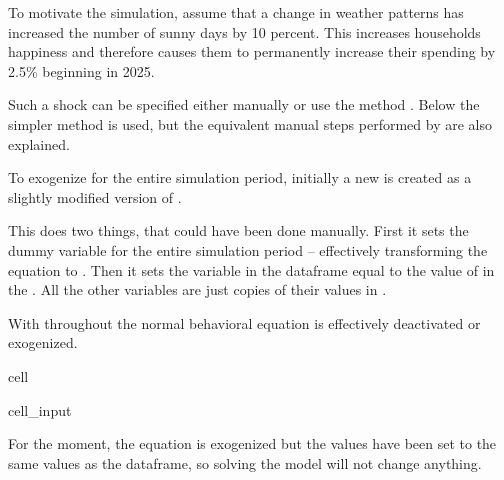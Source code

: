 \documentclass[letterpaper,10pt,english]{jupyterBook}
\begin{document}
\sphinxAtStartPar
To motivate the simulation, assume that a change in weather patterns has increased the number of sunny days by 10 percent. This increases households happiness and therefore causes them to permanently increase their spending by 2.5\% beginning in 2025.

\sphinxAtStartPar
Such a shock can be specified either manually or use the method . Below the simpler  method is used, but the equivalent manual steps performed by  are also explained.

\sphinxAtStartPar
To exogenize  for the entire simulation period, initially a new  is created as a slightly modified version of  .

\sphinxAtStartPar
{}

\sphinxAtStartPar
This does two things, that could have been done manually.  First it sets the dummy variable  for the entire simulation period – effectively transforming the equation to .  Then it sets the variable  in the  dataframe equal to the value of  in the  . All the other variables are  just copies of their values in .

\sphinxAtStartPar
With  throughout the normal behavioral equation is effectively de\sphinxhyphen{}activated or exogenized.

\begin{sphinxuseclass}{cell}\begin{sphinxVerbatimInput}

\begin{sphinxuseclass}{cell_input}
\begin{sphinxVerbatim}[commandchars=\\\{\}]
 
\end{sphinxVerbatim}

\end{sphinxuseclass}\end{sphinxVerbatimInput}

\end{sphinxuseclass}
\sphinxAtStartPar
For the moment, the equation is exogenized but the values have been set to the same values as the  dataframe, so solving the model will not change anything.
\end{document}
